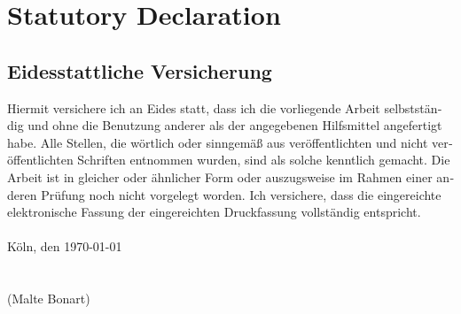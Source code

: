 \documentclass[a4paper, bibtotocnumbered,liststotoc,12pt]{scrartcl}
\theoremstyle{definition}
\theoremstyle{remark}
\numberwithin{figure}{section}
\numberwithin{table}{section}
\numberwithin{equation}{section}
\begin{document}
\newpage
\thispagestyle{plain}
\section{Statutory Declaration}


\begin{otherlanguage}{ngerman}
	
	\section*{Eidesstattliche Versicherung}
	
	 Hiermit versichere ich an Eides statt, dass ich die vorliegende Arbeit selbstständig und ohne die Benutzung anderer als der angegebenen Hilfsmittel angefertigt habe. Alle Stellen, die wörtlich oder sinngemäß aus veröffentlichten und nicht veröffentlichten Schriften entnommen wurden, sind als solche kenntlich gemacht. Die Arbeit ist in gleicher oder ähnlicher Form oder auszugsweise im Rahmen einer anderen Prüfung noch nicht vorgelegt worden. Ich versichere, dass die eingereichte elektronische Fassung der eingereichten Druckfassung vollständig entspricht. \\
	\\
	K\"oln, den \today
	\\
	\\
	\\
	(Malte Bonart)
\end{otherlanguage}


%
%
\end{document}
